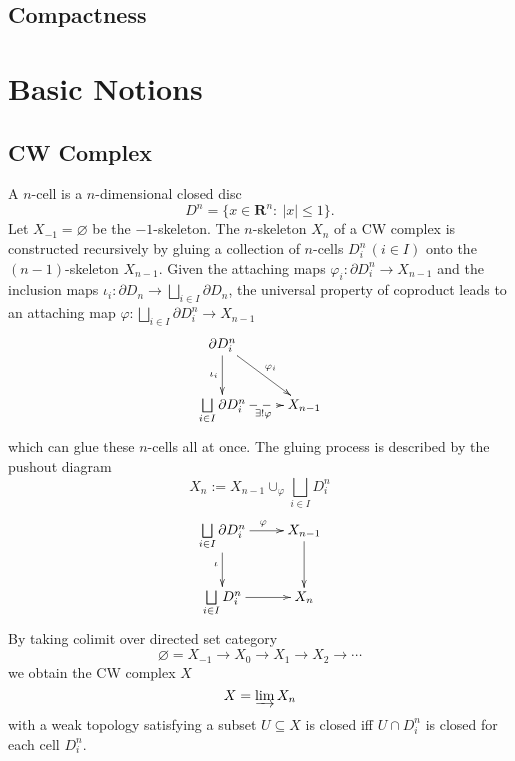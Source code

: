 \documentclass{report}
\begin{document}

\section{Compactness}

\chapter{Basic Notions}
\section{CW Complex}
A $n$-cell is a $n$-dimensional closed disc
\[
	D^n=\{x\in\mathbf{R}^n:\ |x|\le 1\}.
\]
Let $X_{-1}=\varnothing$ be the $-1$-skeleton. The $n$-skeleton $X_n$ of a CW complex is constructed recursively by gluing a collection of $n$-cells $D^n_i\,(i\in I)$ onto the $(n-1)$-skeleton $X_{n-1}$. Given the attaching maps $\varphi_i:\partial D^n_i\to X_{n-1}$ and the inclusion maps $\iota_i:\partial D_n\to \bigsqcup\limits_{i\in I}\partial D_n$, the universal property of coproduct leads to an attaching map $\varphi:\bigsqcup\limits_{i\in I}\partial D^n_i\to X_{n-1}$  
\[\xymatrix{
	\partial D^n_i\ar[rd]^{\varphi_i}\ar[d]_{\iota_i}&\\
	\bigsqcup\limits_{i\in I}\partial D^n_i\ar@{-->}[r]_{\exists!\varphi} &X_{n-1}
		}\]
which can glue these $n$-cells all at once. The gluing process is described by the pushout diagram
\[
	X_{n}:=X_{n-1}\cup_{\varphi}\bigsqcup\limits_{i\in I} D^n_i
\]
\[\xymatrix{
	\bigsqcup\limits_{i\in I}\partial D^n_i\ar[r]^{\varphi}\ar[d]_{\iota}  &X_{n-1}\ar[d]_{}\\
	\bigsqcup\limits_{i\in I} D^n_i\ar@{->}[r]_{}&X_{n}
		}\]
By taking colimit over directed set category
$$
\varnothing=X_{-1} \rightarrow X_0 \rightarrow X_1 \rightarrow X_2 \rightarrow \cdots
$$
we obtain the CW complex $X$
\[
	X=\varinjlim X_n
\]
with a weak topology satisfying a subset $U \subseteq X$ is closed iff $U \cap D^n_i$ is closed for each cell $D^n_i$.
\end{document}
